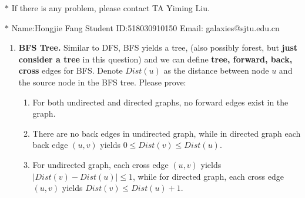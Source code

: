 \documentclass[12pt,a4paper]{article}
\theoremstyle{definition}
\begin{document}
\noindent

\noindent{}
\begin{center}
\footnotesize{\color{red}$*$ If there is any problem, please contact TA Yiming Liu.}

\footnotesize{\color{blue}$*$ Name:Hongjie Fang  \quad Student ID:518030910150 \quad Email: galaxies@sjtu.edu.cn}
\end{center}

\begin{enumerate}
    \item
    \textbf{BFS Tree.} Similar to DFS, BFS yields a tree, (also possibly forest, but \textbf{just consider a tree} in this question) and we can define \textbf{tree, forward, back, cross} edges for BFS. Denote $Dist(u)$ as the distance between node $u$ and the source node in the BFS tree. Please prove:
    \begin{enumerate}
    	\item For both undirected and directed graphs, no forward edges exist in the graph.
    	
    	\item There are no back edges in undirected graph, while in directed graph each back edge $(u,v)$ yields $0\leq Dist(v)\leq Dist(u)$.
    	
    	\item For undirected graph, each cross edge $(u,v)$ yields $|Dist(v)-Dist(u)|\le 1$, while for directed graph, each cross edge $(u,v)$ yields $Dist(v)\leq Dist(u)+1$.
    	
    \end{enumerate}


\end{enumerate}
\end{document}
